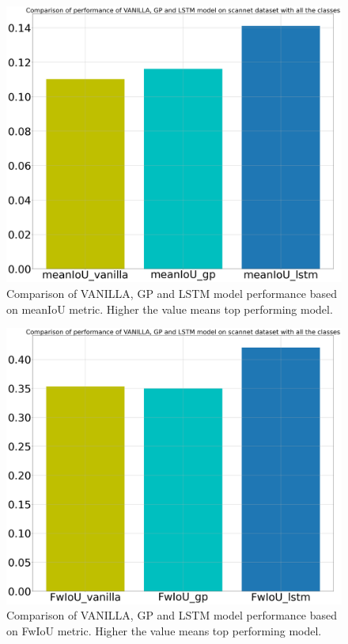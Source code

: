 	\begin{figure}
		\centering
		\includegraphics[width=12cm]{images/all_classes_meanIoU.png}
		\caption{Comparison of VANILLA, GP and LSTM model performance based on meanIoU metric. Higher the value means top performing model.}
		\label{fig:unet_model_metric_comparison_all_classes}
	\end{figure}

	\begin{figure}
		\centering
		\includegraphics[width=12cm]{images/all_classes_FwIoU.png}
		\caption{Comparison of VANILLA, GP and LSTM model performance based on FwIoU metric. Higher the value means top performing model.}
		\label{fig:unet_model_metric_comparison_all_classes}
	\end{figure}
	
